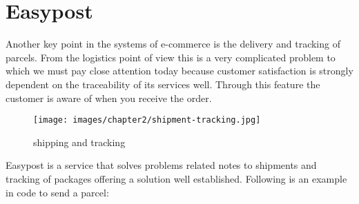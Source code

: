 \section{Easypost}
\label{sec:easypost}
Another key point in the systems of e-commerce is the delivery and tracking of parcels. From the logistics point of view this is a very complicated problem to which we must pay close attention today because customer satisfaction is strongly dependent on the traceability of its services well. Through this feature the customer is aware of when you receive the order.
\begin{figure}[htb]
  \centering
  \texttt{[image: images/chapter2/shipment-tracking.jpg]}\hfill
  \caption[shipping and tracking]{shipping and tracking}
\label{fig:shipping_tracking}
\end{figure}
Easypost is a service that solves problems related notes to shipments and tracking of packages offering a solution well established. Following is an example in code to send a parcel:
